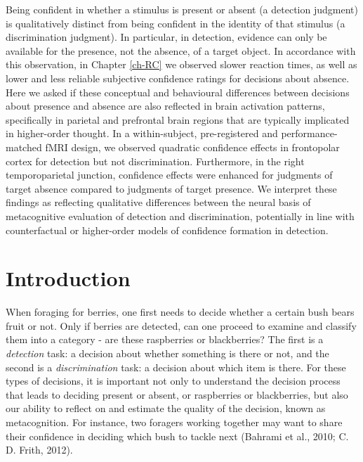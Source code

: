 \documentclass[12pt,twoside]{reedthesis}
\begin{document}
Being confident in whether a stimulus is present or absent (a detection judgment) is qualitatively distinct from being confident in the identity of that stimulus (a discrimination judgment). In particular, in detection, evidence can only be available for the presence, not the absence, of a target object. In accordance with this observation, in Chapter \ref{ch-RC} we observed slower reaction times, as well as lower and less reliable subjective confidence ratings for decisions about absence. Here we asked if these conceptual and behavioural differences between decisions about presence and absence are also reflected in brain activation patterns, specifically in parietal and prefrontal brain regions that are typically implicated in higher-order thought. In a within-subject, pre-registered and performance-matched fMRI design, we observed quadratic confidence effects in frontopolar cortex for detection but not discrimination. Furthermore, in the right temporoparietal junction, confidence effects were enhanced for judgments of target absence compared to judgments of target presence. We interpret these findings as reflecting qualitative differences between the neural basis of metacognitive evaluation of detection and discrimination, potentially in line with counterfactual or higher-order models of confidence formation in detection.

\hypertarget{introduction-4}{%
\section{Introduction}\label{introduction-4}}

When foraging for berries, one first needs to decide whether a certain bush bears fruit or not. Only if berries are detected, can one proceed to examine and classify them into a category - are these raspberries or blackberries? The first is a \emph{detection} task: a decision about whether something is there or not, and the second is a \emph{discrimination} task: a decision about which item is there. For these types of decisions, it is important not only to understand the decision process that leads to deciding present or absent, or raspberries or blackberries, but also our ability to reflect on and estimate the quality of the decision, known as metacognition. For instance, two foragers working together may want to share their confidence in deciding which bush to tackle next (Bahrami et al., 2010; C. D. Frith, 2012).
\end{document}
